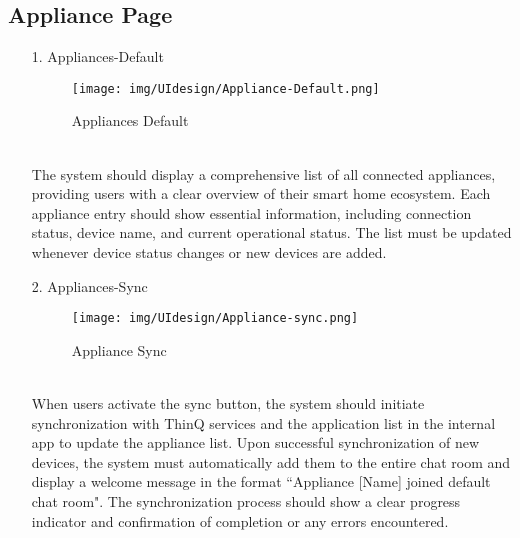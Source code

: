 \documentclass[conference]{IEEEtran}
\begin{document}
\subsection{Appliance Page}
    \begin{enumerate}
    \item[1.] Appliances-Default
    \begin{figure}[h]
\hspace{1.5cm}
\centering
\begin{minipage}{0.4\columnwidth}
    \texttt{[image: img/UIdesign/Appliance-Default.png]}
    \caption{Appliances Default}
\end{minipage}
\end{figure} \\
    The system should display a comprehensive list of all connected appliances, providing users with a clear overview of their smart home ecosystem. Each appliance entry should show essential information, including connection status, device name, and current operational status. The list must be updated whenever device status changes or new devices are added. \\ 
\end{enumerate}

\begin{enumerate}
    \item[2.] Appliances-Sync
    \begin{figure}[h]
\hspace{1.5cm}
\centering
\begin{minipage}{0.3\columnwidth}
    \texttt{[image: img/UIdesign/Appliance-sync.png]}
    \caption{Appliance Sync}
\end{minipage}
\end{figure} \\

    When users activate the sync button, the system should initiate synchronization with ThinQ services and the application list in the internal app to update the appliance list. Upon successful synchronization of new devices, the system must automatically add them to the entire chat room and display a welcome message in the format ``Appliance [Name] joined default chat room". The synchronization process should show a clear progress indicator and confirmation of completion or any errors encountered.
\end{enumerate}
\end{document}
